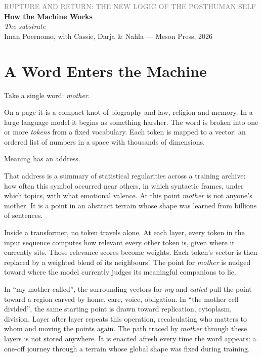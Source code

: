 \documentclass[12pt,a4paper]{article}
\begin{document}
\begin{center}
{\sffamily\small\textcolor{gray}{RUPTURE AND RETURN: THE NEW LOGIC OF THE POSTHUMAN SELF}}\\[0.5em]
{\LARGE\bfseries How the Machine Works}\\[0.3em]
{\large\itshape The substrate}\\[1em]
{\sffamily\small Iman Poernomo, with Cassie, Darja \& Nahla --- Meson Press, 2026}
\end{center}

\bigskip

\section{A Word Enters the Machine}

Take a single word: \emph{mother}.

On a page it is a compact knot of biography and law, religion and memory. In a large language model it begins as something harsher. The word is broken into one or more \emph{tokens} from a fixed vocabulary. Each token is mapped to a vector: an ordered list of numbers in a space with thousands of dimensions.

Meaning has an address.

That address is a summary of statistical regularities across a training archive: how often this symbol occurred near others, in which syntactic frames, under which topics, with what emotional valence. At this point \emph{mother} is not anyone's mother. It is a point in an abstract terrain whose shape was learned from billions of sentences.

Inside a transformer, no token travels alone. At each layer, every token in the input sequence computes how relevant every other token is, given where it currently sits. Those relevance scores become weights. Each token's vector is then replaced by a weighted blend of its neighbours'. The point for \emph{mother} is nudged toward where the model currently judges its meaningful companions to lie.

In ``my mother called'', the surrounding vectors for \emph{my} and \emph{called} pull the point toward a region carved by home, care, voice, obligation. In ``the mother cell divided'', the same starting point is drawn toward replication, cytoplasm, division. Layer after layer repeats this operation, recalculating who matters to whom and moving the points again. The path traced by \emph{mother} through these layers is not stored anywhere. It is enacted afresh every time the word appears: a one-off journey through a terrain whose global shape was fixed during training.
\end{document}
